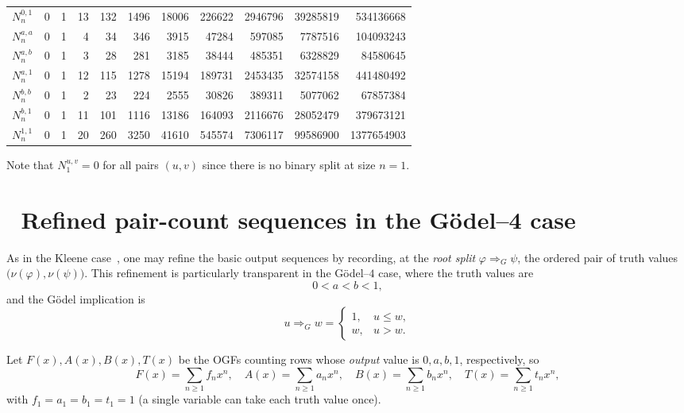 \documentclass[11pt]{article}
\begin{document}
\begin{table}[h]
{\begin{tabular}{l|rrrrrrrrrr}
$N^{0,1}_n$ & 0 & 1 & 13 & 132 & 1496 & 18006 & 226622 & 2946796 & 39285819 & 534136668\\
$N^{a,a}_n$ & 0 & 1 & 4 & 34 & 346 & 3915 & 47284 & 597085 & 7787516 & 104093243\\
$N^{a,b}_n$ & 0 & 1 & 3 & 28 & 281 & 3185 & 38444 & 485351 & 6328829 & 84580645\\
$N^{a,1}_n$ & 0 & 1 & 12 & 115 & 1278 & 15194 & 189731 & 2453435 & 32574158 & 441480492\\
$N^{b,b}_n$ & 0 & 1 & 2 & 23 & 224 & 2555 & 30826 & 389311 & 5077062 & 67857384\\
$N^{b,1}_n$ & 0 & 1 & 11 & 101 & 1116 & 13186 & 164093 & 2116676 & 28052479 & 379673121\\
$N^{1,1}_n$ & 0 & 1 & 20 & 260 & 3250 & 41610 & 545574 & 7306117 & 99586900 & 1377654903\\
\hline
\end{tabular}}
\vspace{2pt}
\par\footnotesize\noindent
Note that $N^{u,v}_1=0$ for all pairs $(u,v)$ since there is no binary split at size $n=1$.
\end{table}



\newpage



\section{  $\;$ Refined pair-count sequences in the G\"odel--4 case}\label{app:godel4-refined-sequences}

As in the Kleene case~\cite{Yildiz2020}, one may refine the basic output sequences by recording,
at the \emph{root split} $\varphi \Rightarrow_G \psi$, the ordered pair of truth values
$\bigl(\nu(\varphi),\nu(\psi)\bigr)$.
This refinement is particularly transparent in the G\"odel--$4$ case, where the truth values are
\[
0<a<b<1,
\]
and the G\"odel implication is
\[
u\Rightarrow_G w=
\begin{cases}
1, & u\le w,\\
w, & u>w.
\end{cases}
\]

Let $F(x),A(x),B(x),T(x)$ be the OGFs counting rows whose \emph{output} value is $0,a,b,1$, respectively,
so
\[
F(x)=\sum_{n\ge1} f_n x^n,\quad
A(x)=\sum_{n\ge1} a_n x^n,\quad
B(x)=\sum_{n\ge1} b_n x^n,\quad
T(x)=\sum_{n\ge1} t_n x^n,
\]
with $f_1=a_1=b_1=t_1=1$ (a single variable can take each truth value once).
\end{document}
